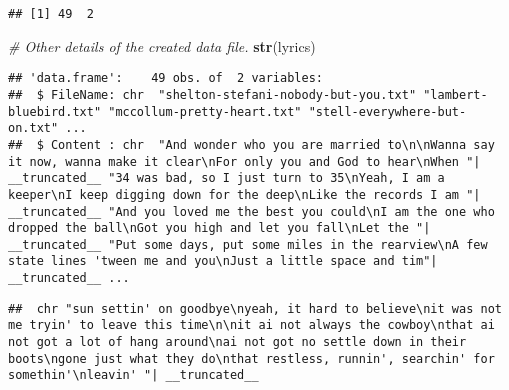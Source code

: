 \documentclass[]{article}
\newenvironment{Shaded}{\begin{snugshade}}{\end{snugshade}}
\newcommand{\CommentTok}[1]{\textcolor[rgb]{0.56,0.35,0.01}{\textit{#1}}}
\newcommand{\DataTypeTok}[1]{\textcolor[rgb]{0.13,0.29,0.53}{#1}}
\newcommand{\DecValTok}[1]{\textcolor[rgb]{0.00,0.00,0.81}{#1}}
\newcommand{\KeywordTok}[1]{\textcolor[rgb]{0.13,0.29,0.53}{\textbf{#1}}}
\newcommand{\NormalTok}[1]{#1}
\newcommand{\OperatorTok}[1]{\textcolor[rgb]{0.81,0.36,0.00}{\textbf{#1}}}
\newcommand{\StringTok}[1]{\textcolor[rgb]{0.31,0.60,0.02}{#1}}
\begin{document}
\begin{verbatim}
## [1] 49  2
\end{verbatim}

\begin{Shaded}
\begin{Highlighting}[]
\CommentTok{# Other details of the created data file.}
\KeywordTok{str}\NormalTok{(lyrics)}
\end{Highlighting}
\end{Shaded}

\begin{verbatim}
## 'data.frame':    49 obs. of  2 variables:
##  $ FileName: chr  "shelton-stefani-nobody-but-you.txt" "lambert-bluebird.txt" "mccollum-pretty-heart.txt" "stell-everywhere-but-on.txt" ...
##  $ Content : chr  "And wonder who you are married to\n\nWanna say it now, wanna make it clear\nFor only you and God to hear\nWhen "| __truncated__ "34 was bad, so I just turn to 35\nYeah, I am a keeper\nI keep digging down for the deep\nLike the records I am "| __truncated__ "And you loved me the best you could\nI am the one who dropped the ball\nGot you high and let you fall\nLet the "| __truncated__ "Put some days, put some miles in the rearview\nA few state lines 'tween me and you\nJust a little space and tim"| __truncated__ ...
\end{verbatim}

\begin{Shaded}
\end{Shaded}

\begin{verbatim}
##  chr "sun settin' on goodbye\nyeah, it hard to believe\nit was not me tryin' to leave this time\n\nit ai not always the cowboy\nthat ai not got a lot of hang around\nai not got no settle down in their boots\ngone just what they do\nthat restless, runnin', searchin' for somethin'\nleavin' "| __truncated__
\end{verbatim}
\end{document}
